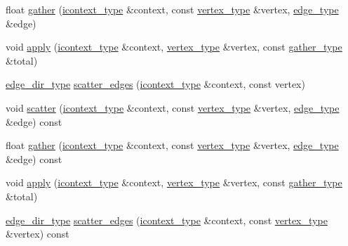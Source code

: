 \begin{DoxyCompactItemize}
float \hyperlink{classpagerank_a2538fd5fbef7bf5032ace5a9427079ca}{gather} (\hyperlink{classsaedb_1_1sae__algorithm_a190f07adbc04f0188ad09b50dbe93a33}{icontext\-\_\-type} \&context, const \hyperlink{classsaedb_1_1sae__algorithm_ae26abf349aed2b0c9f82e1396b78561a}{vertex\-\_\-type} \&vertex, \hyperlink{classsaedb_1_1sae__algorithm_aaebb1836596e0efad3d694a5b829871f}{edge\-\_\-type} \&edge)
\item 
void \hyperlink{classpagerank_aad9830119d9cdf6099749c97c707cb79}{apply} (\hyperlink{classsaedb_1_1sae__algorithm_a190f07adbc04f0188ad09b50dbe93a33}{icontext\-\_\-type} \&context, \hyperlink{classsaedb_1_1sae__algorithm_ae26abf349aed2b0c9f82e1396b78561a}{vertex\-\_\-type} \&vertex, const \hyperlink{classsaedb_1_1sae__algorithm_a4c57e65dd3987f19d5d90bf394c8f2f8}{gather\-\_\-type} \&total)
\item 
\hyperlink{namespacesaedb_adf5ad13c09a48fb2f42f8e7348ea3ac3}{edge\-\_\-dir\-\_\-type} \hyperlink{classpagerank_a6cd84868333a4481a4d824bff82f2649}{scatter\-\_\-edges} (\hyperlink{classsaedb_1_1sae__algorithm_a190f07adbc04f0188ad09b50dbe93a33}{icontext\-\_\-type} \&context, const vertex)
\item 
void \hyperlink{classpagerank_a6216a1bceaf95e35325a0e6d70af35dd}{scatter} (\hyperlink{classsaedb_1_1sae__algorithm_a190f07adbc04f0188ad09b50dbe93a33}{icontext\-\_\-type} \&context, const \hyperlink{classsaedb_1_1sae__algorithm_ae26abf349aed2b0c9f82e1396b78561a}{vertex\-\_\-type} \&vertex, \hyperlink{classsaedb_1_1sae__algorithm_aaebb1836596e0efad3d694a5b829871f}{edge\-\_\-type} \&edge) const 
\item 
float \hyperlink{classpagerank_af1c6b5a1959b6667fb3adf6899d15964}{gather} (\hyperlink{classsaedb_1_1sae__algorithm_a190f07adbc04f0188ad09b50dbe93a33}{icontext\-\_\-type} \&context, const \hyperlink{classsaedb_1_1sae__algorithm_ae26abf349aed2b0c9f82e1396b78561a}{vertex\-\_\-type} \&vertex, \hyperlink{classsaedb_1_1sae__algorithm_aaebb1836596e0efad3d694a5b829871f}{edge\-\_\-type} \&edge) const 
\item 
void \hyperlink{classpagerank_aad9830119d9cdf6099749c97c707cb79}{apply} (\hyperlink{classsaedb_1_1sae__algorithm_a190f07adbc04f0188ad09b50dbe93a33}{icontext\-\_\-type} \&context, \hyperlink{classsaedb_1_1sae__algorithm_ae26abf349aed2b0c9f82e1396b78561a}{vertex\-\_\-type} \&vertex, const \hyperlink{classsaedb_1_1sae__algorithm_a4c57e65dd3987f19d5d90bf394c8f2f8}{gather\-\_\-type} \&total)
\item 
\hyperlink{namespacesaedb_adf5ad13c09a48fb2f42f8e7348ea3ac3}{edge\-\_\-dir\-\_\-type} \hyperlink{classpagerank_a518dd8b8877a509420ed834d8dbd129b}{scatter\-\_\-edges} (\hyperlink{classsaedb_1_1sae__algorithm_a190f07adbc04f0188ad09b50dbe93a33}{icontext\-\_\-type} \&context, const \hyperlink{classsaedb_1_1sae__algorithm_ae26abf349aed2b0c9f82e1396b78561a}{vertex\-\_\-type} \&vertex) const 

\end{DoxyCompactItemize}
